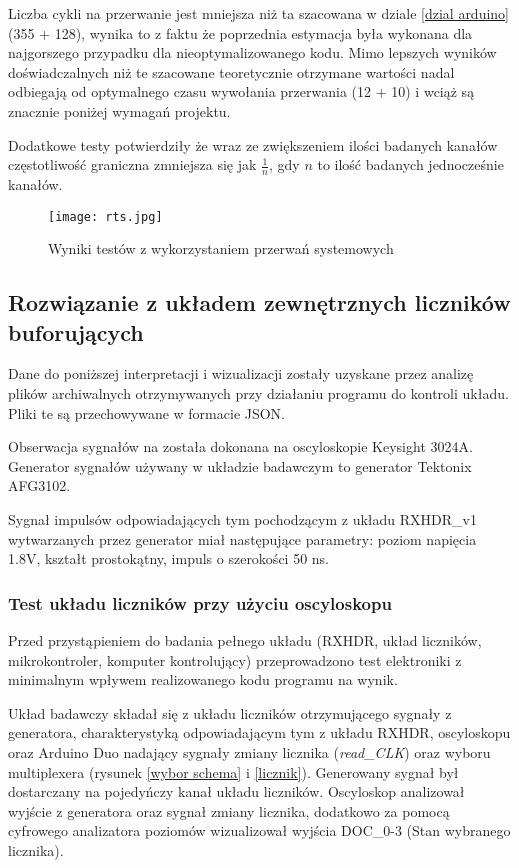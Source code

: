 Liczba cykli na przerwanie jest mniejsza niż ta szacowana w dziale \ref{dzial arduino} (355 + 128)\cite{ard_opt_git}, wynika to z faktu że poprzednia estymacja była wykonana dla najgorszego przypadku dla nieoptymalizowanego kodu.
Mimo lepszych wyników doświadczalnych niż te szacowane teoretycznie otrzymane wartości nadal odbiegają od optymalnego czasu wywołania przerwania (12 + 10) \cite{interupt latency} i wciąż są znacznie poniżej wymagań projektu. 

Dodatkowe testy potwierdziły że wraz ze zwiększeniem ilości badanych kanałów częstotliwość graniczna zmniejsza się jak $\frac{1}{n}$, gdy $n$ to ilość badanych jednocześnie kanałów. 

\begin{figure}[h]
        \centering
        \texttt{[image: rts.jpg]}
        \caption{Wyniki testów z wykorzystaniem przerwań systemowych}
        \label{rts wyniki}
\end{figure}

\subsection{Rozwiązanie z układem zewnętrznych liczników buforujących}

Dane do poniższej interpretacji i wizualizacji zostały uzyskane przez analizę plików archiwalnych otrzymywanych przy działaniu programu do kontroli układu.
Pliki te są przechowywane w formacie JSON.

Obserwacja sygnałów na została dokonana na oscyloskopie Keysight 3024A. Generator sygnałów używany w układzie badawczym to generator Tektonix AFG3102.

Sygnał impulsów odpowiadających tym pochodzącym z układu RXHDR\_v1 wytwarzanych przez generator miał następujące parametry: poziom napięcia 1.8V, kształt prostokątny, impuls o szerokości 50 ns.

\subsubsection{Test układu liczników przy użyciu oscyloskopu}

Przed przystąpieniem do badania pełnego układu (RXHDR, układ liczników, mikrokontroler, komputer kontrolujący) przeprowadzono test elektroniki z minimalnym wpływem realizowanego kodu programu na wynik. 

Układ badawczy składał się z układu liczników  otrzymującego sygnały z generatora, charakterystyką odpowiadającym tym z układu RXHDR, oscyloskopu oraz Arduino Duo nadający sygnały zmiany licznika (\textit{read\_CLK}) oraz wyboru multiplexera (rysunek \ref{wybor schema} i \ref{licznik}). Generowany sygnał był dostarczany na pojedyńczy kanał układu liczników. 
Oscyloskop analizował wyjście z generatora oraz sygnał zmiany licznika, dodatkowo za pomocą cyfrowego analizatora poziomów wizualizował wyjścia DOC\_0-3 (Stan wybranego licznika).

